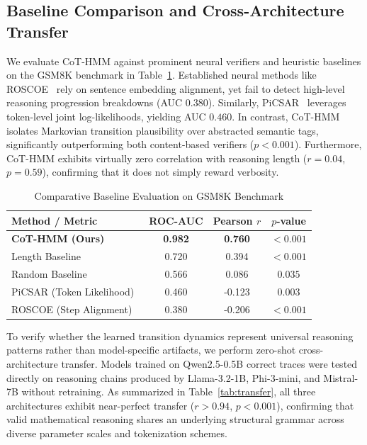 \documentclass{llncs}
\begin{document}
\subsection{Baseline Comparison and Cross-Architecture Transfer}

We evaluate CoT-HMM against prominent neural verifiers and heuristic baselines on the GSM8K benchmark in Table~\ref{tab:baselines}. Established neural methods like ROSCOE~\cite{golovneva2023roscoe} rely on sentence embedding alignment, yet fail to detect high-level reasoning progression breakdowns (AUC $0.380$). Similarly, PiCSAR~\cite{picsar2025} leverages token-level joint log-likelihoods, yielding AUC $0.460$. In contrast, CoT-HMM isolates Markovian transition plausibility over abstracted semantic tags, significantly outperforming both content-based verifiers ($p < 0.001$). Furthermore, CoT-HMM exhibits virtually zero correlation with reasoning length ($r=0.04$, $p=0.59$), confirming that it does not simply reward verbosity.

\begin{table}[t]
\caption{Comparative Baseline Evaluation on GSM8K Benchmark}
\label{tab:baselines}
\centering
\begin{tabular}{lccc}
\toprule
\textbf{Method / Metric} & \textbf{ROC-AUC} & \textbf{Pearson $r$} & \textbf{$p$-value} \\
\midrule
\textbf{CoT-HMM (Ours)} & \textbf{0.982} & \textbf{0.760} & $< 0.001$ \\
Length Baseline & 0.720 & 0.394 & $< 0.001$ \\
Random Baseline & 0.566 & 0.086 & $0.035$ \\
PiCSAR (Token Likelihood)~\cite{picsar2025} & 0.460 & -0.123 & $0.003$ \\
ROSCOE (Step Alignment)~\cite{golovneva2023roscoe} & 0.380 & -0.206 & $< 0.001$ \\
\bottomrule
\end{tabular}
\end{table}

To verify whether the learned transition dynamics represent universal reasoning patterns rather than model-specific artifacts, we perform zero-shot cross-architecture transfer. Models trained on Qwen2.5-0.5B correct traces were tested directly on reasoning chains produced by Llama-3.2-1B, Phi-3-mini, and Mistral-7B without retraining. As summarized in Table~\ref{tab:transfer}, all three architectures exhibit near-perfect transfer ($r > 0.94$, $p < 0.001$), confirming that valid mathematical reasoning shares an underlying structural grammar across diverse parameter scales and tokenization schemes.
\end{document}
